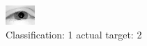 \begin{figure}[h!]
\begin{center}
\includegraphics[width=0.60\columnwidth]{figures/ID2244_class_1_target_2.png}
\end{center}
\caption{ Classification: 1 actual target: 2}
\label{fig:ID2244_class_1_target_2}
\end{figure}
